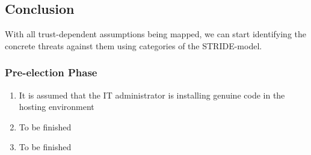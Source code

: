 \subsection{Conclusion} \label{sec: conclusion}
With all trust-dependent assumptions being mapped, we can start identifying the concrete threats against them using categories of the STRIDE-model.


\subsubsection{Pre-election Phase} 

\begin{enumerate}
  \item It is assumed that the IT administrator is installing genuine code in the hosting environment
  \item To be finished
  \item To be finished
\end{enumerate}

